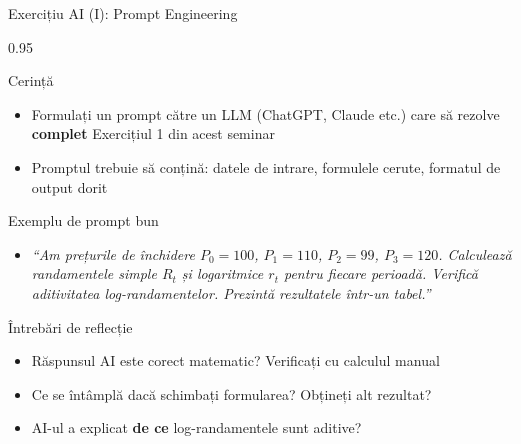 \documentclass[9pt, aspectratio=169, t]{beamer}
\begin{document}
\begin{frame}[shrink=5]{Exercițiu AI (I): Prompt Engineering}
    \begin{cminipage}{0.95\textwidth}
    \begin{block}{Cerință}
    \begin{itemize}\setlength{\itemsep}{0pt}
        \item Formulați un prompt către un LLM (ChatGPT, Claude etc.) care să rezolve \textbf{complet} Exercițiul 1 din acest seminar
        \item Promptul trebuie să conțină: datele de intrare, formulele cerute, formatul de output dorit
    \end{itemize}
    \end{block}
    \vspace{0.1cm}
    \begin{exampleblock}{Exemplu de prompt bun}
    \begin{itemize}\setlength{\itemsep}{0pt}
        \item \textit{``Am prețurile de închidere $P_0=100$, $P_1=110$, $P_2=99$, $P_3=120$. Calculează randamentele simple $R_t$ și logaritmice $r_t$ pentru fiecare perioadă. Verifică aditivitatea log-randamentelor. Prezintă rezultatele într-un tabel.''}
    \end{itemize}
    \end{exampleblock}
    \vspace{0.1cm}
    \begin{alertblock}{Întrebări de reflecție}
    \begin{itemize}\setlength{\itemsep}{0pt}
        \item Răspunsul AI este corect matematic? Verificați cu calculul manual
        \item Ce se întâmplă dacă schimbați formularea? Obțineți alt rezultat?
        \item AI-ul a explicat \textbf{de ce} log-randamentele sunt aditive?
    \end{itemize}
    \end{alertblock}
    \end{cminipage}
\end{frame}
\end{document}
